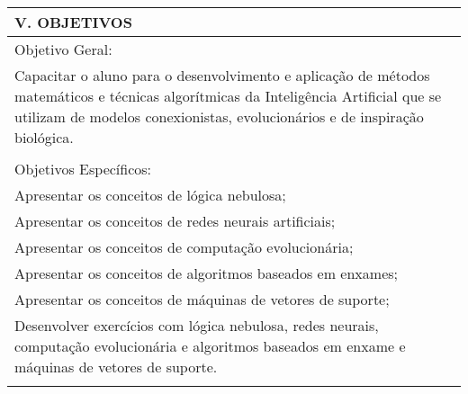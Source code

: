 \documentclass[12pt]{article}
\begin{document}
\begin{longtable}{|L{1.025\textwidth}|} \hline
%
{\bf V. OBJETIVOS } \\ \hline
%
Objetivo Geral: \\
Capacitar o aluno para o desenvolvimento e aplicação de métodos matemáticos e técnicas algorítmicas da Inteligência Artificial que se utilizam de modelos conexionistas, evolucionários e de inspiração biológica.\\
\\
Objetivos Específicos:\\
Apresentar os conceitos de lógica nebulosa;\\
Apresentar os conceitos de redes neurais artificiais;\\
Apresentar os conceitos de computação evolucionária;\\
Apresentar os conceitos de algoritmos baseados em enxames;\\
Apresentar os conceitos de máquinas de vetores de suporte;\\
Desenvolver exercícios com lógica nebulosa, redes neurais, computação evolucionária e algoritmos baseados em enxame e máquinas de vetores de suporte.\\

\\ \hline
\end{longtable}
\end{document}
